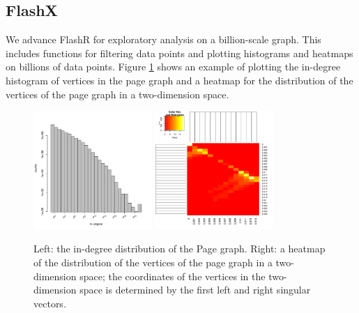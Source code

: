 \documentclass[simplex.tex]{subfiles}
\begin{document}
\subsection{FlashX}

We advance FlashR for exploratory analysis on a billion-scale
graph. This includes functions for filtering data points and plotting
histograms and heatmaps on billions of data points. Figure \ref{fig:FlashX}
shows an example of plotting the in-degree histogram of vertices in the page
graph and a heatmap for the distribution of the vertices of the page graph in
a two-dimension space.

\begin{figure}[!h]
\begin{cframed}
\centering
\includegraphics[width=0.4\textwidth]{../../figs/hist-indeg.pdf}
\includegraphics[width=0.4\textwidth]{../../figs/pg_xy_heatmap.pdf}
\caption{Left: the in-degree distribution of the Page graph.
	Right: a heatmap of the distribution of the vertices of the page graph
	in a two-dimension space; the coordinates of the vertices
	in the two-dimension space is determined by the first left and right
	singular vectors.}
\label{fig:FlashX}
\end{cframed}
\end{figure}

\clearpage
\end{document}
